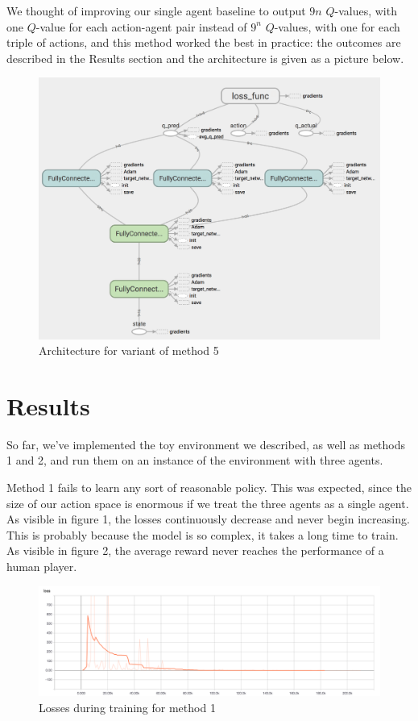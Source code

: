 \documentclass{article}
\begin{document}
We thought of improving our single agent baseline to output
$9n$ $Q$-values, with one $Q$-value for each action-agent pair instead of
$9^n$ $Q$-values, with one for each triple of actions, and this method worked the
best in practice: the outcomes are described in the Results section and the
architecture is given as a picture below.

\begin{figure}[H]
\centering
\includegraphics[scale=0.15]{clever_single.png}
\caption{Architecture for variant of method 5}
\end{figure}

\section{Results}

So far, we've implemented the toy environment we described, as well as methods
1 and 2, and run them on an instance of the environment with three agents.

Method 1 fails to learn any sort of reasonable policy. This was expected,
since the size of our action space is enormous if we treat the three agents as a
single agent. As visible in figure 1, the losses continuously decrease and never
begin increasing. This is probably because the model is so complex, it takes a
long time to train. As visible in figure 2, the average reward  never reaches
the performance of a human player.

\begin{figure}[H]
\centering
\includegraphics[scale=0.2]{naive_loss.png}
\caption{Losses during training for method 1}
\end{figure}
\end{document}
